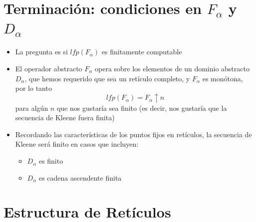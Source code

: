 \documentclass[11pt]{article}
\begin{document}
\section*{Terminación: condiciones en \(F_\alpha\) y \(D_\alpha\)}
\label{sec:org7de3f15}
\begin{itemize}
\item La pregunta es si \(lfp(F_\alpha)\) es finitamente computable
\item El operador abstracto \(F_\alpha\) opera sobre los elementos de un
dominio abstracto \(D_\alpha\), que hemos requerido que sea un
retículo completo, y \(F_\alpha\) es monótona, por lo tanto
$$lfp(F_\alpha) = F_\alpha \uparrow n$$ para algún \(n\) que nos
gustaría sea finito (es decir, nos gustaría que la secuencia de Kleene fuera finita)
\item Recordando las características de los puntos fijos en retículos, la
secuencia de Kleene será finito en casos que incluyen:
\begin{itemize}
\item \(D_\alpha\) es finito
\item \(D_\alpha\) es cadena ascendente finita
\end{itemize}
\end{itemize}


\section*{Estructura de Retículos}
\label{sec:org80c815c}
\end{document}
